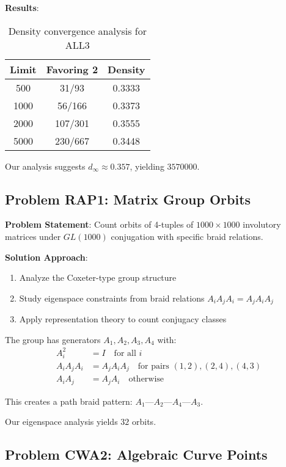\documentclass[11pt]{article}
\begin{document}
\textbf{Results}:
\begin{table}[h]
\centering
\begin{tabular}{@{}ccc@{}}
\toprule
Limit & Favoring 2 & Density \\
\midrule
500 & 31/93 & 0.3333 \\
1000 & 56/166 & 0.3373 \\
2000 & 107/301 & 0.3555 \\
5000 & 230/667 & 0.3448 \\
\bottomrule
\end{tabular}
\caption{Density convergence analysis for ALL3}
\end{table}

Our analysis suggests $d_{\infty} \approx 0.357$, yielding $\boxed{3570000}$.

\subsection{Problem RAP1: Matrix Group Orbits}

\textbf{Problem Statement}: Count orbits of 4-tuples of $1000 \times 1000$ involutory matrices under $GL(1000)$ conjugation with specific braid relations.

\textbf{Solution Approach}:
\begin{enumerate}
\item Analyze the Coxeter-type group structure
\item Study eigenspace constraints from braid relations $A_i A_j A_i = A_j A_i A_j$
\item Apply representation theory to count conjugacy classes
\end{enumerate}

The group has generators $A_1, A_2, A_3, A_4$ with:
\begin{align}
A_i^2 &= I \quad \text{for all } i \\
A_i A_j A_i &= A_j A_i A_j \quad \text{for pairs } (1,2), (2,4), (4,3) \\
A_i A_j &= A_j A_i \quad \text{otherwise}
\end{align}

This creates a path braid pattern: $A_1 — A_2 — A_4 — A_3$.

Our eigenspace analysis yields $\boxed{32}$ orbits.

\subsection{Problem CWA2: Algebraic Curve Points}
\end{document}
